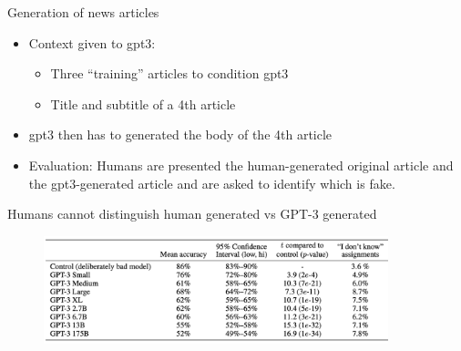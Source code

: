 \begin{vbframe}{Generation of news articles}

\vfill

  \begin{itemize}
\pause\item Context given to gpt3:
  \begin{itemize}
\pause\item Three ``training'' articles to condition gpt3
\pause\item Title and subtitle of a 4th article
    \end{itemize}
\pause\item gpt3 then has to generated the body of the 4th article
\pause\item Evaluation: Humans are presented the
human-generated original article and the gpt3-generated
article and are asked to identify which is fake.
    \end{itemize}

\vfill

\end{vbframe}




\begin{vbframe}{Humans cannot distinguish human generated vs GPT-3 generated}

\vfill

	\begin{figure}
		\centering
		\includegraphics[width=10cm]{figure/humanvsmachine.png}
	\end{figure}

\vfill

\end{vbframe}




